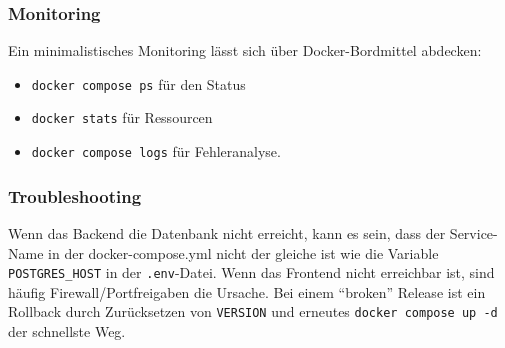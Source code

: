\documentclass[12pt,a4paper]{article}
\begin{document}
    \subsubsection{Monitoring}
    Ein minimalistisches Monitoring lässt sich über Docker-Bordmittel abdecken:
    \begin{itemize}
        \item \texttt{docker compose ps} für den Status
        \item \texttt{docker stats} für Ressourcen
        \item \texttt{docker compose logs} für Fehleranalyse.
    \end{itemize}

    \subsubsection{Troubleshooting}
    Wenn das Backend die Datenbank nicht erreicht, kann es sein, dass der Service-Name in der docker-compose.yml nicht der gleiche ist wie die Variable \texttt{POSTGRES\_HOST} in der \texttt{.env}-Datei.
    Wenn das Frontend nicht erreichbar ist, sind häufig Firewall/Portfreigaben die Ursache. Bei einem \enquote{broken} Release ist ein Rollback durch Zurücksetzen von \texttt{VERSION} und erneutes \texttt{docker compose up -d} der schnellste Weg.
\end{document}
